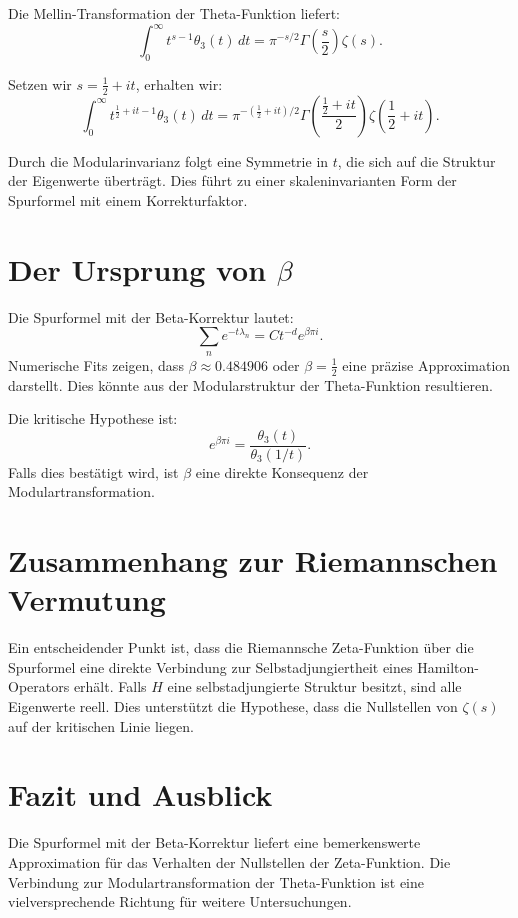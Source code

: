 \documentclass[a4paper,12pt]{article}
\begin{document}
Die Mellin-Transformation der Theta-Funktion liefert:
\begin{equation}
    \int_0^\infty t^{s-1} \theta_3 (t) \, dt = \pi^{-s/2} \Gamma\left(\frac{s}{2}\right) \zeta(s).
\end{equation}

Setzen wir \( s = \frac{1}{2} + it \), erhalten wir:
\begin{equation}
    \int_0^\infty t^{\frac{1}{2} + it - 1} \theta_3 (t) \, dt = \pi^{-(\frac{1}{2} + it)/2} \Gamma\left(\frac{\frac{1}{2} + it}{2}\right) \zeta\left(\frac{1}{2} + it\right).
\end{equation}

Durch die Modularinvarianz folgt eine Symmetrie in \( t \), die sich auf die Struktur der Eigenwerte überträgt. Dies führt zu einer skaleninvarianten Form der Spurformel mit einem Korrekturfaktor.

\section{Der Ursprung von \( \beta \)}
Die Spurformel mit der Beta-Korrektur lautet:
\begin{equation}
    \sum_n e^{-t \lambda_n} = C t^{-d} e^{\beta \pi i}.
\end{equation}
Numerische Fits zeigen, dass \( \beta \approx 0.484906 \) oder \( \beta = \frac{1}{2} \) eine präzise Approximation darstellt. Dies könnte aus der Modularstruktur der Theta-Funktion resultieren.

Die kritische Hypothese ist:
\begin{equation}
    e^{\beta \pi i} = \frac{\theta_3 (t)}{\theta_3 (1/t)}.
\end{equation}
Falls dies bestätigt wird, ist \( \beta \) eine direkte Konsequenz der Modulartransformation.

\section{Zusammenhang zur Riemannschen Vermutung}
Ein entscheidender Punkt ist, dass die Riemannsche Zeta-Funktion über die Spurformel eine direkte Verbindung zur Selbstadjungiertheit eines Hamilton-Operators erhält. Falls \( H \) eine selbstadjungierte Struktur besitzt, sind alle Eigenwerte reell. Dies unterstützt die Hypothese, dass die Nullstellen von \( \zeta(s) \) auf der kritischen Linie liegen.

\section{Fazit und Ausblick}
Die Spurformel mit der Beta-Korrektur liefert eine bemerkenswerte Approximation für das Verhalten der Nullstellen der Zeta-Funktion. Die Verbindung zur Modulartransformation der Theta-Funktion ist eine vielversprechende Richtung für weitere Untersuchungen.
\end{document}
